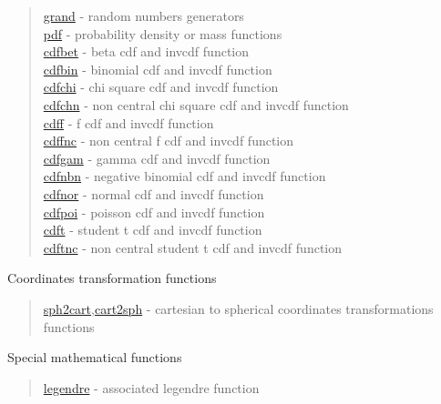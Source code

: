 \begin{quote}
\noindent
\hyperlink{grand}{grand} - random numbers generators \\
\hyperlink{pdf}{pdf} - probability density or mass functions \\
\hyperlink{cdfbet}{cdfbet} - beta cdf and invcdf function \\
\hyperlink{cdfbin}{cdfbin} - binomial cdf and invcdf function \\
\hyperlink{cdfchi}{cdfchi} - chi square cdf and invcdf function \\
\hyperlink{cdfchn}{cdfchn} - non central chi square cdf and invcdf function \\
\hyperlink{cdff}{cdff} - f cdf and invcdf function \\
\hyperlink{cdffnc}{cdffnc} - non central f cdf and invcdf function \\
\hyperlink{cdfgam}{cdfgam} - gamma cdf and invcdf function \\
\hyperlink{cdfnbn}{cdfnbn} - negative binomial cdf and invcdf function \\
\hyperlink{cdfnor}{cdfnor} - normal cdf and invcdf function \\
\hyperlink{cdfpoi}{cdfpoi} - poisson cdf and invcdf function \\
\hyperlink{cdft}{cdft} - student t cdf and invcdf function \\
\hyperlink{cdftnc}{cdftnc} - non central student t cdf and invcdf function \\
\end{quote}

Coordinates transformation functions

\begin{quote}
\noindent
\hyperlink{sph2cart}{sph2cart},\hyperlink{cart2sph}{cart2sph} -
cartesian to spherical coordinates transformations functions \\
\end{quote}


Special mathematical functions

\begin{quote}
\noindent
\hyperlink{legendre}{legendre} - associated legendre function\\
\end{quote}



 
 












 

 
 
 

 
  
  
  
 
 
 
 
 
 
 
 
 


